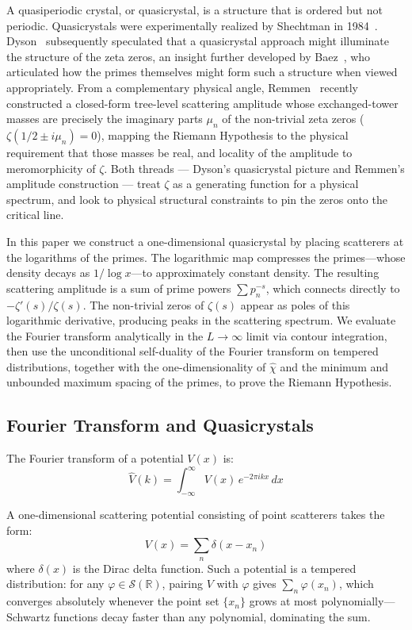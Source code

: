\documentclass[11pt, oneside]{article}
\theoremstyle{definition}
\begin{document}
A quasiperiodic crystal, or quasicrystal, is a structure that
is ordered but not periodic. Quasicrystals were experimentally
realized by Shechtman in 1984~\cite{Shechtman1984}.
Dyson~\cite{Dyson2009} subsequently speculated that a
quasicrystal approach might illuminate the structure of the
zeta zeros, an insight further developed by
Baez~\cite{Baez2013}, who articulated how the primes themselves
might form such a structure when viewed appropriately. From a
complementary physical angle, Remmen~\cite{Remmen2021} recently
constructed a closed-form tree-level scattering amplitude whose
exchanged-tower masses are precisely the imaginary parts
$\mu_n$ of the non-trivial zeta zeros
($\zeta(1/2 \pm i\mu_n) = 0$), mapping the Riemann Hypothesis
to the physical requirement that those masses be real, and
locality of the amplitude to meromorphicity of $\zeta$. Both
threads --- Dyson's quasicrystal picture and Remmen's
amplitude construction --- treat $\zeta$ as a generating
function for a physical spectrum, and look to physical
structural constraints to pin the zeros onto the critical line.

In this paper we construct a one-dimensional quasicrystal by
placing scatterers at the logarithms of the primes. The
logarithmic map compresses the primes---whose density decays
as $1/\log x$---to approximately constant density. The
resulting scattering amplitude is a sum of prime powers
$\sum p_n^{-s}$, which connects directly to
$-\zeta'(s)/\zeta(s)$. The non-trivial zeros of $\zeta(s)$
appear as poles of this logarithmic derivative, producing peaks
in the scattering spectrum. We evaluate the Fourier transform
analytically in the $L\to\infty$ limit via contour integration,
then use the unconditional self-duality of the Fourier
transform on tempered distributions, together with the
one-dimensionality of $\hat\chi$ and the minimum and unbounded
maximum spacing of the primes, to prove the Riemann Hypothesis.

\subsection{Fourier Transform and Quasicrystals}

The Fourier transform of a potential $V(x)$ is:
\begin{equation}
\hat{V}(k) = \int_{-\infty}^{\infty} V(x)\,e^{-2\pi ikx}\,dx
\end{equation}

A one-dimensional scattering potential consisting of point
scatterers takes the form:
\begin{equation}
V(x) = \sum_{n}\delta(x - x_n)
\end{equation}
where $\delta(x)$ is the Dirac delta function.
Such a potential is a tempered distribution: for any
$\varphi \in \mathcal{S}(\mathbb{R})$, pairing $V$ with $\varphi$
gives $\sum_n \varphi(x_n)$, which converges absolutely whenever
the point set $\{x_n\}$ grows at most polynomially---Schwartz
functions decay faster than any polynomial, dominating the sum.
\end{document}
